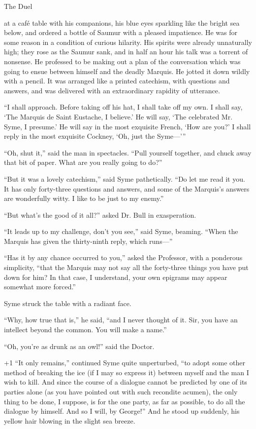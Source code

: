 \chap[duel] The Duel

 at a café table with his companions, his blue eyes sparkling like the bright sea below, and ordered a bottle of Saumur with a pleased impatience. He was for some reason in a condition of curious hilarity. His spirits were already unnaturally high; they rose as the Saumur sank, and in half an hour his talk was a torrent of nonsense. He professed to be making out a plan of the conversation which was going to ensue between himself and the deadly Marquis. He jotted it down wildly with a pencil. It was arranged like a printed catechism, with questions and answers, and was delivered with an extraordinary rapidity of utterance.

“I shall approach. Before taking off his hat, I shall take off my own. I shall say, ‘The Marquis de Saint Eustache, I believe.’ He will say, ‘The celebrated Mr. Syme, I presume.’ He will say in the most exquisite French, ‘How are you?’ I shall reply in the most exquisite Cockney, ‘Oh, just the Syme⁠—’ ”

“Oh, shut it,” said the man in spectacles. “Pull yourself together, and chuck away that bit of paper. What are you really going to do?”

“But it was a lovely catechism,” said Syme pathetically. “Do let me read it you. It has only forty-three questions and answers, and some of the Marquis’s answers are wonderfully witty. I like to be just to my enemy.”

“But what’s the good of it all?” asked Dr. Bull in exasperation.

“It leads up to my challenge, don’t you see,” said Syme, beaming. “When the Marquis has given the thirty-ninth reply, which runs⁠—”

“Has it by any chance occurred to you,” asked the Professor, with a ponderous simplicity, “that the Marquis may not say all the forty-three things you have put down for him? In that case, I understand, your own epigrams may appear somewhat more forced.”

Syme struck the table with a radiant face.

“Why, how true that is,” he said, “and I never thought of it. Sir, you have an intellect beyond the common. You will make a name.”

“Oh, you’re as drunk as an owl!” said the Doctor.

\looseness+1
“It only remains,” continued Syme quite unperturbed, “to adopt some other method of breaking the ice (if I may so express it) between myself and the man I wish to kill. And since the course of a dialogue cannot be predicted by one of its parties alone (as you have pointed out with such recondite acumen), the only thing to be done, I suppose, is for the one party, as far as possible, to do all the dialogue by himself. And so I will, by George!” And he stood up suddenly, his yellow hair blowing in the slight sea breeze.

